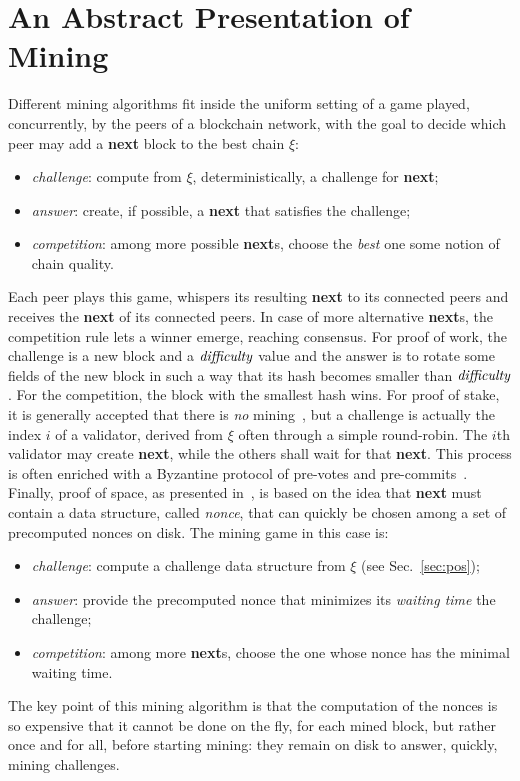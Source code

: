 \section{An Abstract Presentation of Mining}\label{sec:mining}

Different mining algorithms fit inside the uniform setting of a game
played, concurrently, by the peers of a blockchain network, with the
goal to decide which peer may add a \textbf{next} block to the best chain $\xi$:
%
\begin{itemize}
\item \emph{challenge}: compute from $\xi$, deterministically, a challenge for \textbf{next};
\item \emph{answer}: create, if possible, a \textbf{next} that satisfies the challenge;
\item \emph{competition}: among more possible \textbf{next}s, choose the \emph{best} one
  \wrt{} some notion of chain quality.
\end{itemize}
%
Each peer plays this game, whispers its resulting \textbf{next} to its
connected peers and receives the \textbf{next} of its connected peers. In case
of more alternative \textbf{next}s, the competition rule lets a
winner emerge, reaching consensus.
For proof of work, the challenge is a new block and a ${\mathit{difficulty}}$
value and the answer is to rotate some fields of the new block in such a way that
its hash becomes smaller than ${\mathit{difficulty}}$. For the competition, the block with the
smallest hash wins.
For proof of stake, it is generally accepted that there is
\emph{no} mining~\cite{Kwon14}, but a challenge is actually the index $i$ of a validator,
derived from $\xi$ often through a simple round-robin. The $i$th validator may create
\textbf{next}, while the others shall wait for that \textbf{next}.
This process is often enriched with a Byzantine protocol
of pre-votes and pre-commits~\cite{Kwon14}.
Finally, proof of space, as presented in~\cite{Spoto25},
is based on the idea that \textbf{next} must contain
a data structure, called \emph{nonce}, that can quickly be chosen among a
set of precomputed nonces on disk. The mining game in this case is:
%
\begin{itemize}
\item \emph{challenge}: compute a challenge data structure from $\xi$ (see Sec.~\ref{sec:pos});
\item \emph{answer}: provide the precomputed nonce
  that minimizes its \emph{waiting time} \wrt{} the challenge;
\item \emph{competition}: among more \textbf{next}s, choose the one whose
  nonce has the minimal waiting time.
\end{itemize}
%
The key point of this mining algorithm
is that the computation of the nonces is so expensive
that it cannot be done on the fly, for each mined block, but rather
once and for all, before starting mining:
they remain on disk to answer, quickly, mining challenges.

